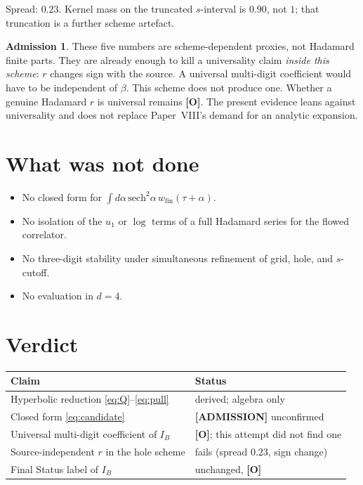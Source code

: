 \documentclass[11pt]{article}
\theoremstyle{definition}
\newtheorem*{admission}{Admission}
\newcommand{\pO}{\textbf{[O]}}
\newcommand{\pA}{\textbf{[ADMISSION]}}
\newcommand{\IB}{I_B}
\begin{document}
Spread: $0.23$. Kernel mass on the truncated $s$-interval is $0.90$,
not $1$; that truncation is a further scheme artefact.

\begin{admission}
These five numbers are scheme-dependent proxies, not Hadamard finite
parts. They are already enough to kill a universality claim
\emph{inside this scheme}: $r$ changes sign with the source. A
universal multi-digit coefficient would have to be independent of
$\beta$. This scheme does not produce one. Whether a genuine
Hadamard $r$ is universal remains \pO{}. The present evidence leans
against universality and does not replace Paper~VIII's demand for an
analytic expansion.
\end{admission}

\section{What was not done}

\begin{itemize}[leftmargin=1.4em]
\item No closed form for
$\displaystyle\int d\alpha\,\mathrm{sech}^{2}\alpha\,w_{\mathrm{fin}}(\tau+\alpha)$.
\item No isolation of the $u_1$ or $\log$ terms of a full Hadamard
series for the flowed correlator.
\item No three-digit stability under simultaneous refinement of
grid, hole, and $s$-cutoff.
\item No evaluation in $d=4$.
\end{itemize}

\section{Verdict}

\begin{center}
\begin{tabular}{@{}p{}p{}@{}}
\toprule
Claim & Status \\
\midrule
Hyperbolic reduction \eqref{eq:Q}--\eqref{eq:pull} &
derived; algebra only \\
Closed form \eqref{eq:candidate} &
\pA{} unconfirmed \\
Universal multi-digit coefficient of $\IB$ &
\pO{}; this attempt did not find one \\
Source-independent $r$ in the hole scheme &
fails (spread $0.23$, sign change) \\
Final Status label of $\IB$ &
unchanged, \pO{} \\
\bottomrule
\end{tabular}
\end{center}
\end{document}
